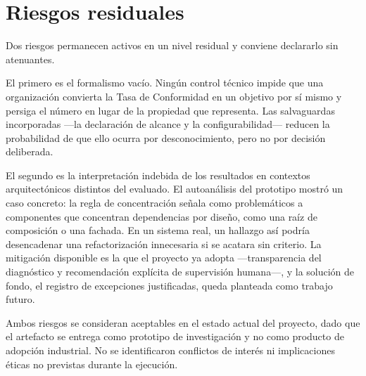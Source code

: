 \section{Riesgos residuales}
Dos riesgos permanecen activos en un nivel residual y conviene declararlo sin atenuantes.

El primero es el formalismo vacío. Ningún control técnico impide que una organización convierta la Tasa de Conformidad en un objetivo por sí mismo y persiga el número en lugar de la propiedad que representa. Las salvaguardas incorporadas —la declaración de alcance y la configurabilidad— reducen la probabilidad de que ello ocurra por desconocimiento, pero no por decisión deliberada.

El segundo es la interpretación indebida de los resultados en contextos arquitectónicos distintos del evaluado. El autoanálisis del prototipo mostró un caso concreto: la regla de concentración señala como problemáticos a componentes que concentran dependencias por diseño, como una raíz de composición o una fachada. En un sistema real, un hallazgo así podría desencadenar una refactorización innecesaria si se acatara sin criterio. La mitigación disponible es la que el proyecto ya adopta —transparencia del diagnóstico y recomendación explícita de supervisión humana—, y la solución de fondo, el registro de excepciones justificadas, queda planteada como trabajo futuro.

Ambos riesgos se consideran aceptables en el estado actual del proyecto, dado que el artefacto se entrega como prototipo de investigación y no como producto de adopción industrial. No se identificaron conflictos de interés ni implicaciones éticas no previstas durante la ejecución.
